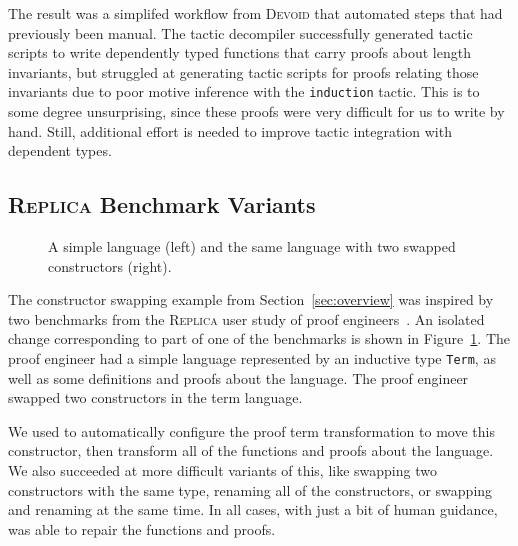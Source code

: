The result was a simplifed workflow from \textsc{Devoid} that automated steps 
that had previously been manual.
The tactic decompiler successfully generated tactic scripts to write dependently typed
functions that carry proofs about length invariants,
but struggled at generating tactic scripts for proofs relating those invariants due to poor motive inference with the \lstinline{induction} tactic.
This is to some degree unsurprising, since these proofs
were very difficult for us to write by hand.
Still, additional effort is needed to improve tactic integration with dependent types.

\subsection{\textsc{Replica} Benchmark Variants}
\label{sec:replica}

\begin{figure}
\begin{minipage}{0.48\textwidth}
   
\end{minipage}
\hfill
\begin{minipage}{0.48\textwidth}
   
\end{minipage}
\vspace{-0.3cm}
\caption{A simple language (left) and the same language with two swapped constructors (right).}
\label{fig:replica}
\end{figure}

The constructor swapping example from Section~\ref{sec:overview} was inspired by two benchmarks 
from the \textsc{Replica} user study of proof engineers~\cite{replica}.
An isolated change corresponding to part of one of the benchmarks is shown in Figure~\ref{fig:replica}.
The proof engineer had a simple language represented by an inductive type \lstinline{Term},
as well as some definitions and proofs about the language.
The proof engineer swapped two constructors in the term language.

We used \toolname to automatically configure the proof term transformation to move this constructor,
then transform all of the functions and proofs about the language.
We also succeeded at more difficult variants of this,
like swapping two constructors with the same type, renaming all of the constructors,
or swapping and renaming at the same time.
In all cases, with just a bit of human guidance, \toolname was able to repair the functions and proofs.

